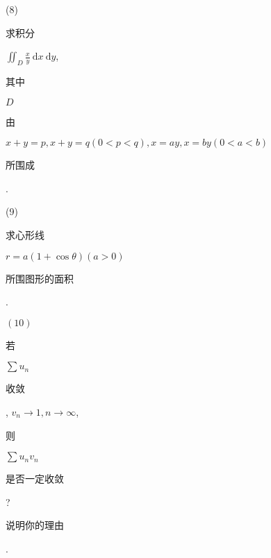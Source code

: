 \documentclass[10pt]{article}
\begin{document}
(8) \begin{CJK}{UTF8}{mj}求积分\end{CJK} $\iint_{D} \frac{x}{y} \mathrm{~d} x \mathrm{~d} y$, \begin{CJK}{UTF8}{mj}其中\end{CJK} $D$ \begin{CJK}{UTF8}{mj}由\end{CJK} $x+y=p, x+y=q(0<p<q), x=a y, x=b y(0<a<b)$ \begin{CJK}{UTF8}{mj}所围成\end{CJK}.

(9) \begin{CJK}{UTF8}{mj}求心形线\end{CJK} $r=a(1+\cos \theta)(a>0)$ \begin{CJK}{UTF8}{mj}所围图形的面积\end{CJK}.

$(10)$ \begin{CJK}{UTF8}{mj}若\end{CJK} $\sum u_{n}$ \begin{CJK}{UTF8}{mj}收敛\end{CJK}, $v_{n} \rightarrow 1, n \rightarrow \infty$, \begin{CJK}{UTF8}{mj}则\end{CJK} $\sum u_{n} v_{n}$ \begin{CJK}{UTF8}{mj}是否一定收敛\end{CJK}? \begin{CJK}{UTF8}{mj}说明你的理由\end{CJK}.
\end{document}

